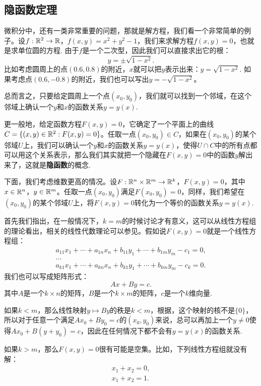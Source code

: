 \subsection{隐函数定理}

微积分中，还有一类非常重要的问题，那就是解方程，我们看一个非常简单的例子。设$f:\mathbb{R}^2\to\mathbb{R}$，$f(x,y)=x^2+y^2-1$，我们来求解方程$f(x,y)=0$，也就是求单位圆的方程. 由于$f$是一个二次型，因此我们可以直接求出它的根：
    \[y=\pm\sqrt{1-x^2}.\]
比如考虑圆周上的点$(0.6,0.8)$的附近，$x$就可以把$y$表示出来：$y=\sqrt{1-x^2}$. 如果考虑点$(0.6,-0.8)$的附近，我们也可以写出$y=-\sqrt{1-x^2}$。
    
总而言之，只要给定圆周上一个点$(x_0,y_0)$，我们就可以找到一个邻域，在这个邻域上确认一个$y$和$x$的函数关系$y=y(x)$.

更一般地，给定函数方程$F(x,y)=0$，它确定了一个平面上的曲线$C=\{(x,y)\in\mathbb{R}^2:F(x,y)=0\}$。任取一点$(x_0,y_0)\in C$，如果在$(x_0,y_0)$的某个邻域$U$上，我们可以确认一个$y$和$x$的函数关系$y=y(x)$，使得$U\cap C$中的所有点都可以用这个关系表示，那么我们其实就把一个隐藏在$F(x,y)=0$中的函数$y$解出来了，这就是\textbf{隐函数}的概念.

下面，我们考虑维数更高的情况。设$F:\mathbb{R}^n\times\mathbb{R}^m\to\mathbb{R}^k$，$F(x,y)=0$，其中$x\in\mathbb{R}^n$，$y\in\mathbb{R}^m$。任取一点$(x_0,y_0)$满足$F(x_0,y_0)=0$，同样，我们希望在$(x_0,y_0)$的某个邻域$U$上，将$F(x,y)=0$转化为一个等价的函数关系$y=y(x)$. 

首先我们指出，在一般情况下，$k=m$的时候讨论才有意义，这可以从线性方程组的理论看出，相关的线性代数理论可以参见。假如说$F(x,y)=0$就是一个线性方程组：
\begin{equation}
    \begin{gathered}
        a_{11}x_1+\cdots+a_{1n}x_n+b_{11}y_1+\cdots+b_{1m}y_m-c_1=0, \\
        \dots \\
        a_{k1}x_1+\cdots+a_{kn}x_n+b_{k1}y_1+\cdots+b_{km}y_m-c_k=0.
    \end{gathered}
    \label{eq:linear-equation}
\end{equation}
我们也可以写成矩阵形式：
\[Ax+By=c.\]
其中$A$是一个$k\times n$的矩阵，$B$是一个$k\times m$的矩阵，$c$是一个$k$维向量.

如果$k<m$，那么线性映射$y\mapsto By$的秩是$k<m$，根据，这个映射的核不是$\{0\}$，所以对于任意一个满足$Ax_0+By_0=c$的$(x_0,y_0)$来说，总可以再加上一个$y\neq 0$使得$Ax_0+B(y+y_0)=c$，因此在任何情况下都不会有$y=y(x)$的函数关系.

如果$k>m$，那么$F(x,y)=0$很有可能是空集。比如，下列线性方程组就没有解：
\begin{gather*}
    x_1+x_2=0, \\
    x_1+x_2=1.
\end{gather*}

